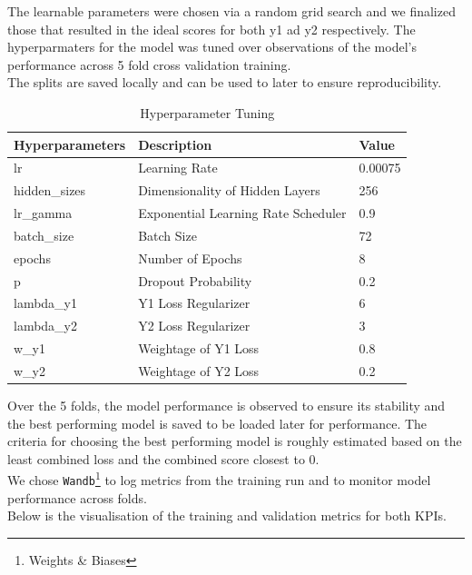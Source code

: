 \documentclass{report} %
\begin{document}
The learnable parameters were chosen via a random grid search and we finalized those that resulted in the ideal scores for both y1 ad y2 respectively.
The hyperparmaters for the model was tuned over observations of the model's performance across 5 fold cross validation training.\\
The splits are saved locally and can be used to later to ensure reproducibility.

\begin{table}[H]
    \centering
    \begin{tabularx}{1\linewidth}{|X|X|X|}
    \hline {\bf Hyperparameters} & {\bf Description} & {\bf Value}\\
    \hline 
    lr & Learning Rate & 0.00075 \\
    hidden\_sizes & Dimensionality of Hidden Layers& 256 \\
    lr\_gamma & Exponential Learning Rate Scheduler & 0.9 \\
    batch\_size & Batch Size & 72 \\
    epochs & Number of Epochs & 8 \\
    p & Dropout Probability& 0.2 \\
    lambda\_y1 & Y1 Loss Regularizer & 6 \\
    lambda\_y2 & Y2 Loss Regularizer & 3 \\
    w\_y1 & Weightage of Y1 Loss & 0.8 \\
    w\_y2 & Weightage of Y2 Loss & 0.2 \\
    \hline
    \end{tabularx}
    \caption{Hyperparameter Tuning}
    \label{tab:Hyperparameter Tuning}
\end{table}

Over the 5 folds, the model performance is observed to ensure its stability and the best performing model is saved to be loaded later for performance.
The criteria for choosing the best performing model is roughly estimated based on the least combined loss and the combined score closest to 0.\\
We chose \texttt{Wandb}\footnote{Weights \& Biases} to log metrics from the training run and to monitor model performance across folds. \\
Below is the visualisation of the training and validation metrics for both \ac{KPI}s.\\
\end{document}
